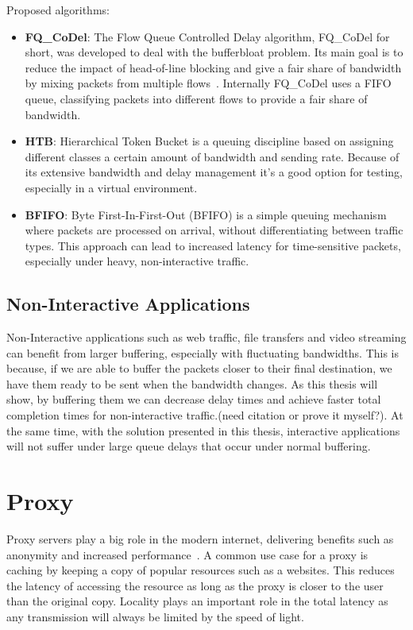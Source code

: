\documentclass[a4paper,english, 11pt]{report}
\begin{document}
Proposed algorithms:
\begin{itemize}
  \item \textbf{FQ\_CoDel}: The Flow Queue Controlled Delay algorithm, FQ\_CoDel for short, was developed to deal with the bufferbloat problem. Its main goal is to reduce the impact of head-of-line blocking and give a fair share of bandwidth by mixing packets from multiple flows~\cite{fq_codel_rfc}. Internally FQ\_CoDel uses a FIFO queue, classifying packets into different flows to provide a fair share of bandwidth.
  \item \textbf{HTB}: Hierarchical Token Bucket is a queuing discipline based on assigning different classes a certain amount of bandwidth and sending rate. Because of its extensive bandwidth and delay management it's a good option for testing, especially in a virtual environment.
  \item \textbf{BFIFO}: Byte First-In-First-Out (BFIFO) is a simple queuing mechanism where packets are processed on arrival, without differentiating between traffic types. This approach can lead to increased latency for time-sensitive packets, especially under heavy, non-interactive traffic.
\end{itemize}

\subsection{Non-Interactive Applications}
Non-Interactive applications such as web traffic, file transfers and video streaming can benefit from larger buffering, especially with fluctuating bandwidths. This is because, if we are able to buffer the packets closer to their final destination, we have them ready to be sent when the bandwidth changes. As this thesis will show, by buffering them we can decrease delay times and achieve faster total completion times for non-interactive traffic.(need citation or prove it myself?). At the same time, with the solution presented in this thesis, interactive applications will not suffer under large queue delays that occur under normal buffering.

\section{Proxy}
Proxy servers play a big role in the modern internet, delivering benefits such as anonymity and increased performance~\cite{nextgen_proxy_servers}. A common use case for a proxy is caching by keeping a copy of popular resources such as a websites. This reduces the latency of accessing the resource as long as the proxy is closer to the user than the original copy. Locality plays an important role in the total latency as any transmission will always be limited by the speed of light.\\
\end{document}
